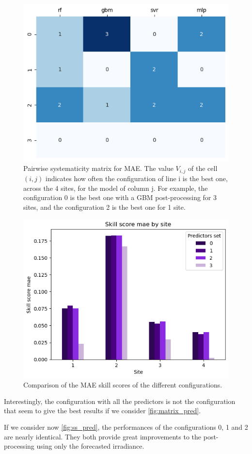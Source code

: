\newpage
\begin{figure}[htb!]
    \centering
    \includegraphics[width=0.6\columnwidth]{figures/first_study/comp_predictors_mae.png}
\caption{Pairwise systematicity matrix for MAE. The value $V_{i,j}$ of the cell $(i,j)$ indicates how often the configuration of line i is the best one, across the 4 sites, for the model of column j. For example, the configuration 0 is the best one with a GBM post-processing for 3 sites, and the configuration 2 is the best one for 1 site.}
\label{fig:matrix_pred}
\end{figure}

\begin{figure}[htb!]
    \centering
    \includegraphics[width=0.72\columnwidth]{figures/first_study/comp_predictors_mae_svr.png}
\caption{Comparison of the MAE skill scores of the different configurations.}
    \label{fig:ss_pred}
\end{figure}

\newpage
Interestingly, the configuration with all the predictors is not the configuration that seem to give the best results if we consider \autoref{fig:matrix_pred}.

If we consider now \autoref{fig:ss_pred}, the performances of the configurations 0, 1 and 2 are nearly identical. They both provide great improvements to the post-processing using only the forecasted irradiance.

